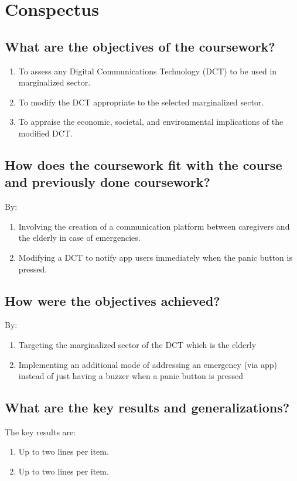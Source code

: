 \section{Conspectus}
\label{sec:cnspcts}

\IEEEpubidadjcol %

\subsection{What are the objectives of the coursework?}
\begin{enumerate}
	\item To assess any Digital Communications Technology (DCT) to be used in marginalized sector.
	\item To modify the DCT appropriate to the selected marginalized sector.
	\item To appraise the economic, societal, and environmental implications of the modified DCT.
\end{enumerate}	

\subsection{How does the coursework fit with the course and previously done coursework?}
By:
\begin{enumerate}
	\item Involving the creation of a communication platform between caregivers and the elderly in case of emergencies.
	\item Modifying a DCT to notify app users immediately when the panic button is pressed.
\end{enumerate}	

\subsection{How were the objectives achieved?}
By:
\begin{enumerate}
	\item Targeting the marginalized sector of the DCT which is the elderly
	\item Implementing an additional mode of addressing an emergency (via app) instead of just having a buzzer when a panic button is pressed
\end{enumerate}

	
\subsection{What are the key results and generalizations?}
The key results are:
\begin{enumerate}
	\item Up to two lines per item.
	\item Up to two lines per item.
\end{enumerate}

